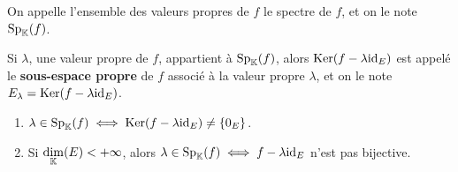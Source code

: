 \documentclass[12pt, a4paper]{report}
\begin{document}
\begin{definition}[Spectre]
    On appelle l'ensemble des valeurs propres de $f$ le spectre de $f$, et on le note $\mathrm{Sp}_{\mathbb{K}}(f)$.
\end{definition}

\begin{definition}
    Si $\lambda$, une valeur propre de $f$, appartient à $\mathrm{Sp}_{\mathbb{K}}(f)$, alors $\mathrm{Ker}(f-\lambda \mathrm{id}_E)$ est appelé le \textbf{sous-espace propre} de $f$ associé à la valeur propre $\lambda$, et on le note $E_\lambda = \mathrm{Ker}(f - \lambda \mathrm{id}_E)$.
\end{definition}

\begin{remark}
    \begin{enumerate}
        \item $\lambda \in \mathrm{Sp}_{\mathbb{K}}(f) \iff \mathrm{Ker}(f - \lambda \mathrm{id}_E) \neq \{0_E\}$.
        \item Si $\underset{\mathbb{K}}\dim(E) < +\infty$, alors $\lambda \in \mathrm{Sp}_{\mathbb{K}}(f) \iff f - \lambda \mathrm{id}_E$ n'est pas bijective.
    \end{enumerate}
\end{remark}
\end{document}

